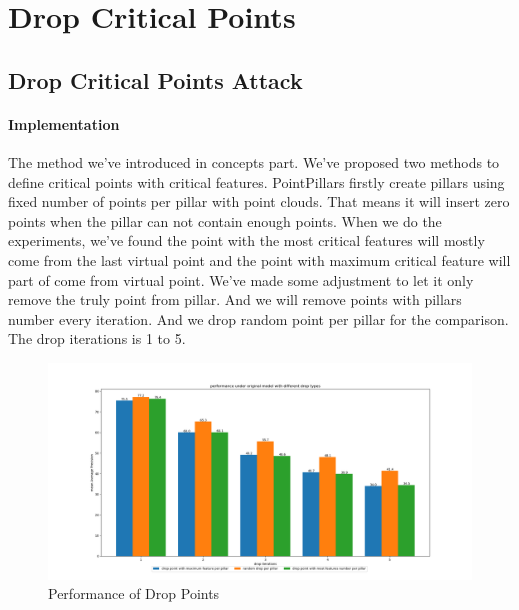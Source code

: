 \section{Drop Critical Points}
\subsection{Drop Critical Points Attack}
\paragraph{Implementation}
The method we've introduced in concepts part. We've proposed two methods to define critical points with critical features. PointPillars\cite{lang_pointpillars_2019} firstly create pillars using fixed number of points per pillar with point clouds. That means it will insert zero points when the pillar can not contain enough points. When we do the experiments, we've found the point with the most critical features will mostly come from the last virtual point and the point with maximum critical feature will part of come from virtual point. We've made some adjustment to let it only remove the truly point from pillar. And we will remove points with pillars number every iteration. And we drop random point per pillar for the comparison. The drop iterations is 1 to 5.
\begin{figure}[!htbp]
\centering
\includegraphics[scale=0.3]{Graphics/Points Drop.png}
\caption{Performance of Drop Points}
\label{fig:Drop Points}
\end{figure}

